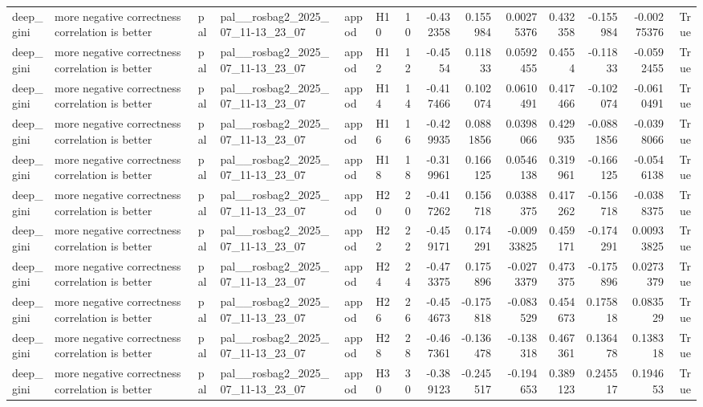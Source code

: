 \begin{longtable}{llllllrrrrrrrr}
deep\_gini & more negative correctness correlation is better & pal & pal\_\_rosbag2\_2025\_07\_11-13\_23\_07 & appod & H10 & 10 & -0.432358 & 0.155984 & 0.00275376 & 0.432358 & -0.155984 & -0.00275376 & True \\
deep\_gini & more negative correctness correlation is better & pal & pal\_\_rosbag2\_2025\_07\_11-13\_23\_07 & appod & H12 & 12 & -0.4554 & 0.11833 & 0.0592455 & 0.4554 & -0.11833 & -0.0592455 & True \\
deep\_gini & more negative correctness correlation is better & pal & pal\_\_rosbag2\_2025\_07\_11-13\_23\_07 & appod & H14 & 14 & -0.417466 & 0.102074 & 0.0610491 & 0.417466 & -0.102074 & -0.0610491 & True \\
deep\_gini & more negative correctness correlation is better & pal & pal\_\_rosbag2\_2025\_07\_11-13\_23\_07 & appod & H16 & 16 & -0.429935 & 0.0881856 & 0.0398066 & 0.429935 & -0.0881856 & -0.0398066 & True \\
deep\_gini & more negative correctness correlation is better & pal & pal\_\_rosbag2\_2025\_07\_11-13\_23\_07 & appod & H18 & 18 & -0.319961 & 0.166125 & 0.0546138 & 0.319961 & -0.166125 & -0.0546138 & True \\
deep\_gini & more negative correctness correlation is better & pal & pal\_\_rosbag2\_2025\_07\_11-13\_23\_07 & appod & H20 & 20 & -0.417262 & 0.156718 & 0.0388375 & 0.417262 & -0.156718 & -0.0388375 & True \\
deep\_gini & more negative correctness correlation is better & pal & pal\_\_rosbag2\_2025\_07\_11-13\_23\_07 & appod & H22 & 22 & -0.459171 & 0.174291 & -0.00933825 & 0.459171 & -0.174291 & 0.00933825 & True \\
deep\_gini & more negative correctness correlation is better & pal & pal\_\_rosbag2\_2025\_07\_11-13\_23\_07 & appod & H24 & 24 & -0.473375 & 0.175896 & -0.0273379 & 0.473375 & -0.175896 & 0.0273379 & True \\
deep\_gini & more negative correctness correlation is better & pal & pal\_\_rosbag2\_2025\_07\_11-13\_23\_07 & appod & H26 & 26 & -0.454673 & -0.175818 & -0.083529 & 0.454673 & 0.175818 & 0.083529 & True \\
deep\_gini & more negative correctness correlation is better & pal & pal\_\_rosbag2\_2025\_07\_11-13\_23\_07 & appod & H28 & 28 & -0.467361 & -0.136478 & -0.138318 & 0.467361 & 0.136478 & 0.138318 & True \\
deep\_gini & more negative correctness correlation is better & pal & pal\_\_rosbag2\_2025\_07\_11-13\_23\_07 & appod & H30 & 30 & -0.389123 & -0.245517 & -0.194653 & 0.389123 & 0.245517 & 0.194653 & True \\

\end{longtable}
